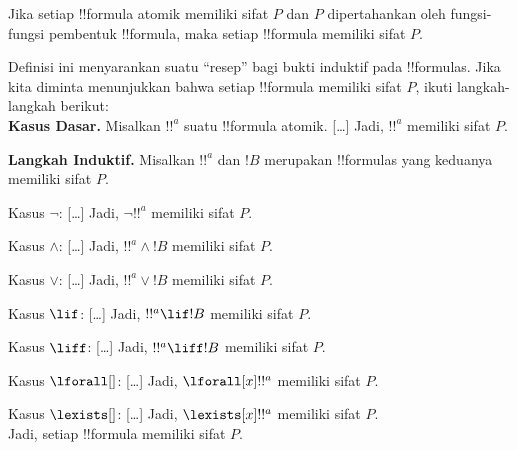 \documentclass[../../../include/open-logic-section]{subfiles}
\begin{document}
\begin{defn}
Jika setiap !!{formula} atomik memiliki sifat $P$ dan $P$ dipertahankan oleh
fungsi-fungsi pembentuk !!{formula}, maka setiap !!{formula} memiliki sifat
$P$.
\end{defn}

\begin{explain}
Definisi ini menyarankan suatu ``resep'' bagi bukti induktif pada
!!{formula}s. Jika kita diminta menunjukkan bahwa setiap !!{formula} memiliki
sifat $P$, ikuti langkah-langkah berikut:\\

\textbf{Kasus Dasar.} Misalkan $!!^a$ suatu !!{formula} atomik. [\ldots]
Jadi, $!!^a$ memiliki sifat $P$.

\textbf{Langkah Induktif.} Misalkan $!!^a$ dan $!B$ merupakan !!{formula}s
yang keduanya memiliki sifat $P$.

Kasus $\lnot$: [\ldots] Jadi, $\lnot !!^a$ memiliki sifat $P$.

Kasus $\land$: [\ldots] Jadi, $!!^a \land !B$ memiliki sifat $P$.

Kasus $\lor$: [\ldots] Jadi, $!!^a \lor !B$ memiliki sifat $P$.

Kasus $\lif$: [\ldots] Jadi, $!!^a \lif !B$ memiliki sifat $P$.

Kasus $\liff$: [\ldots] Jadi, $!!^a \liff !B$ memiliki sifat $P$.

Kasus $\lforall[]$: [\ldots] Jadi, $\lforall[x] !!^a$ memiliki sifat $P$.

Kasus $\lexists[]$: [\ldots] Jadi, $\lexists[x] !!^a$ memiliki sifat $P$. \\

Jadi, setiap !!{formula} memiliki sifat $P$.
\end{explain}
\end{document}
